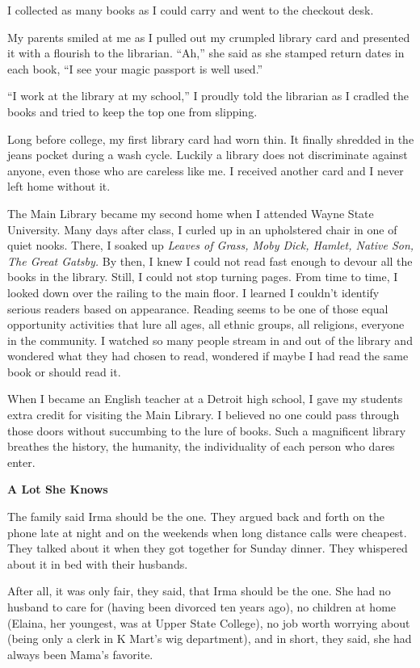 \documentclass[
]{article}
\begin{document}
I collected as many books as I could carry and went to the checkout
desk.

My parents smiled at me as I pulled out my crumpled library card and
presented it with a flourish to the librarian. ``Ah,'' she said as she
stamped return dates in each book, ``I see your magic passport is well
used.''

``I work at the library at my school,'' I proudly told the librarian as
I cradled the books and tried to keep the top one from slipping.

Long before college, my first library card had worn thin. It finally
shredded in the jeans pocket during a wash cycle. Luckily a library does
not discriminate against anyone, even those who are care­less like me. I
received another card and I never left home without it.

The Main Library became my second home when I attended Wayne State
University. Many days after class, I curled up in an upholstered chair
in one of quiet nooks. There, I soaked up \emph{Leaves of Grass, Moby
Dick, Hamlet, Native Son, The Great Gatsby.} By then, I knew I could not
read fast enough to devour all the books in the library. Still, I could
not stop turning pages. From time to time, I looked down over the
railing to the main floor. I learned I couldn't identify serious readers
based on appearance. Reading seems to be one of those equal opportunity
activities that lure all ages, all ethnic groups, all religions,
everyone in the community. I watched so many people stream in and out of
the library and wondered what they had chosen to read, wondered if maybe
I had read the same book or should read it.

When I became an English teacher at a Detroit high school, I gave my
students extra credit for visiting the Main Library. I believed no one
could pass through those doors without succumbing to the lure of books.
Such a magnificent library breathes the history, the humanity, the
individuality of each person who dares enter.

\textbf{\hfill\break
}

\textbf{A Lot She Knows}

The family said Irma should be the one. They argued back and forth on
the phone late at night and on the weekends when long distance calls
were cheapest. They talked about it when they got together for Sunday
dinner. They whispered about it in bed with their husbands.

After all, it was only fair, they said, that Irma should be the one. She
had no husband to care for (having been divorced ten years ago), no
children at home (Elaina, her youngest, was at Upper State College), no
job worth worrying about (being only a clerk in K Mart's wig
department), and in short, they said, she had always been Mama's
favorite.
\end{document}
